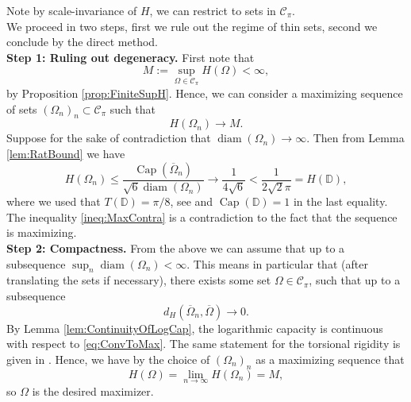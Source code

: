 \documentclass[11pt]{article}
\theoremstyle{plain}
\numberwithin{equation}{section}
\theoremstyle{definition}
\let\oldendproof\endproof
\renewenvironment{proof}[1][\proofname]{%
\oldproof[\upshape \bfseries #1]%
}{\oldendproof}
\DeclareMathOperator{\cp}{Cap}
\DeclareMathOperator{\diam}{diam}
\def \Om{\Omega}
\def \mc{\mathcal}
\def \mb{\mathbb}
\begin{document}
    \begin{proof}[Proof of Theorem \ref{thm:ExistenceOfMaximizer}]
        Note by scale-invariance of $H$, we can restrict to sets in $\mc C_\pi$.\\ We proceed in two steps, first we rule out the regime of thin sets, second we conclude by the direct method.\\
        \textbf{Step 1: Ruling out degeneracy.} First note that
        \[
        M:=\sup_{\Om\in \mc C_\pi}H(\Om)<\infty,
        \]
        by Proposition \ref{prop:FiniteSupH}. Hence, we can consider a maximizing sequence of sets $(\Om_n)_n \subset \mc C_\pi$ such that  
        \[
        H(\Om_n)\to M.
        \]
        Suppose for the sake of contradiction that $\diam(\Om_n) \to \infty$. Then from Lemma \ref{lem:RatBound} we have 
        \begin{equation}
            \label{ineq:MaxContra}
             H(\Om_n)\leq \frac{\cp(\overline \Om_n)}{\sqrt{6}\diam(\Om_n)}\to\frac{1}{4\sqrt{6}}<\frac{1}{2\sqrt{2}\pi}=H(\mb D),
        \end{equation}
        where we used that $T(\mb D)=\pi/8$, see \cite[Equation (9)]{van2023some} and $\cp(\mb D)=1$ in the last equality. The inequality \eqref{ineq:MaxContra} is a contradiction to the fact that the sequence is maximizing.\\
        \textbf{Step 2: Compactness.} From the above we can assume that up to a subsequence $\sup_{n}
        \diam(\Om_n)<\infty$. This means in particular that (after translating the sets if necessary), there exists some set $\Om \in \mc C_\pi$, such that up to a subsequence
        \begin{equation}
            \label{eq:ConvToMax}
            d_H(\overline \Om_n,\overline \Om)\to 0.
        \end{equation}
        By Lemma \ref{lem:ContinuityOfLogCap}, the logarithmic capacity is continuous with respect to \eqref{eq:ConvToMax}. The same statement for the torsional rigidity is given in \cite[Theorem 3.8]{colesanti2010minkowski}. Hence, we have by the choice of $(\Om_n)_n$ as a maximizing sequence that
        \[
        H(\Om)=\lim_{n\to \infty}H(\Om_n)=M,
        \]
        so $\Om$ is the desired maximizer.
    \end{proof}
    
\end{document}
